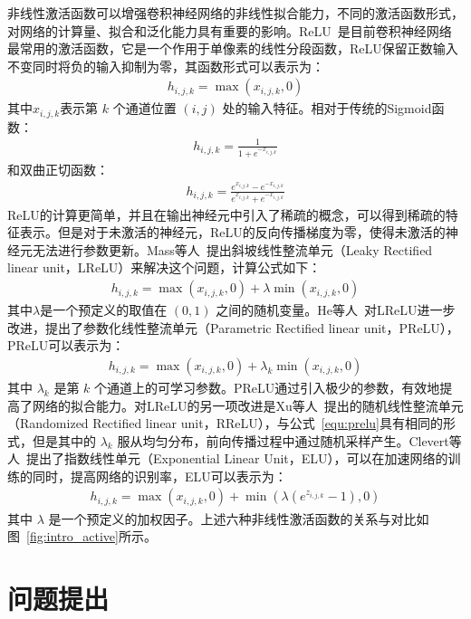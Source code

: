非线性激活函数可以增强卷积神经网络的非线性拟合能力，不同的激活函数形式，对网络的计算量、拟合和泛化能力具有重要的影响。ReLU~\cite{nair2010rectified}是目前卷积神经网络最常用的激活函数，它是一个作用于单像素的线性分段函数，ReLU保留正数输入不变同时将负的输入抑制为零，其函数形式可以表示为：
\begin{eqnarray} \label{equ:relu}
h_{i,j,k}=\max(x_{i,j,k},0)
\end{eqnarray}
其中$x_{i,j,k}$表示第 $k$ 个通道位置 $(i,j)$ 处的输入特征。相对于传统的Sigmoid函数：
\begin{eqnarray} \label{equ:sigmoid}
h_{i,j,k}=\frac{1}{1+e^{-x_{i,j,k}}}
\end{eqnarray}
和双曲正切函数：
\begin{eqnarray} \label{equ:tanh}
h_{i,j,k}=\frac{e^{x_{i,j,k}}-e^{-x_{i,j,k}}}{e^{x_{i,j,k}}+e^{-x_{i,j,k}}}
\end{eqnarray}
ReLU的计算更简单，并且在输出神经元中引入了稀疏的概念，可以得到稀疏的特征表示。但是对于未激活的神经元，ReLU的反向传播梯度为零，使得未激活的神经元无法进行参数更新。Mass等人~\cite{maas2013rectifier}提出斜坡线性整流单元（Leaky Rectified linear unit，LReLU）来解决这个问题，计算公式如下：
\begin{eqnarray} \label{equ:lrelu}
h_{i,j,k}=\max(x_{i,j,k},0)+{\lambda}\min(x_{i,j,k},0)
\end{eqnarray}
其中$\lambda$是一个预定义的取值在 $(0,1)$ 之间的随机变量。He等人~\cite{he2015delving}对LReLU进一步改进，提出了参数化线性整流单元（Parametric Rectified linear unit，PReLU），PReLU可以表示为：
\begin{eqnarray} \label{equ:prelu}
h_{i,j,k}=\max(x_{i,j,k},0)+{\lambda}_k\min(x_{i,j,k},0)
\end{eqnarray}
其中 ${\lambda}_k$ 是第 $k$ 个通道上的可学习参数。PReLU通过引入极少的参数，有效地提高了网络的拟合能力。对LReLU的另一项改进是Xu等人~\cite{xu2015empirical}提出的随机线性整流单元（Randomized Rectified linear unit，RReLU），与公式~\ref{equ:prelu}具有相同的形式，但是其中的 ${\lambda}_k$ 服从均匀分布，前向传播过程中通过随机采样产生。Clevert等人~\cite{clevert2015fast}提出了指数线性单元（Exponential Linear Unit，ELU），可以在加速网络的训练的同时，提高网络的识别率，ELU可以表示为：
\begin{eqnarray} \label{equ:elu}
h_{i,j,k}=\max(x_{i,j,k},0)+\min({\lambda}(e^{z_{i,j,k}}-1),0)
\end{eqnarray}
其中 $\lambda$ 是一个预定义的加权因子。上述六种非线性激活函数的关系与对比如图~\ref{fig:intro_active}所示。


\section{问题提出}
\label{sec:question}

